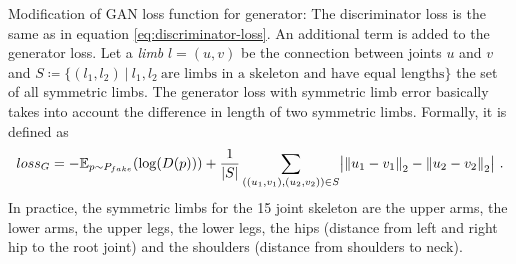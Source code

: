 Modification of GAN loss function for generator:
The discriminator loss is the same as in equation \ref{eq:discriminator-loss}. 
An additional term is added to the generator loss. Let a \textit{limb} $l = (u, v)$ be the connection between joints $u$ and $v$ and $S \coloneqq \{(l_1, l_2)~|~ l_1, l_2~\text{are limbs in a skeleton and have equal lengths}\}$ the set of all symmetric limbs. 
The generator loss with symmetric limb error basically takes into account the difference in length of two symmetric limbs.
Formally, it is defined as 
\begin{equation}
	loss_G = -\mathbb{E}_{p\sim P_{fake}}(\log(D(p))) 
	+ \frac{1}{|S|}\sum_{((u_1, v_1), (u_2, v_2)) \in S} \bigl\lvert \norm{u_1 - v_1}_2 - \norm{u_2 - v_2}_2 \bigr\rvert \ .
\end{equation}
In practice, the symmetric limbs for the 15 joint skeleton are the upper arms, the lower arms, the upper legs, the lower legs, the hips (distance from left and right hip to the root joint) and the shoulders (distance from shoulders to neck).